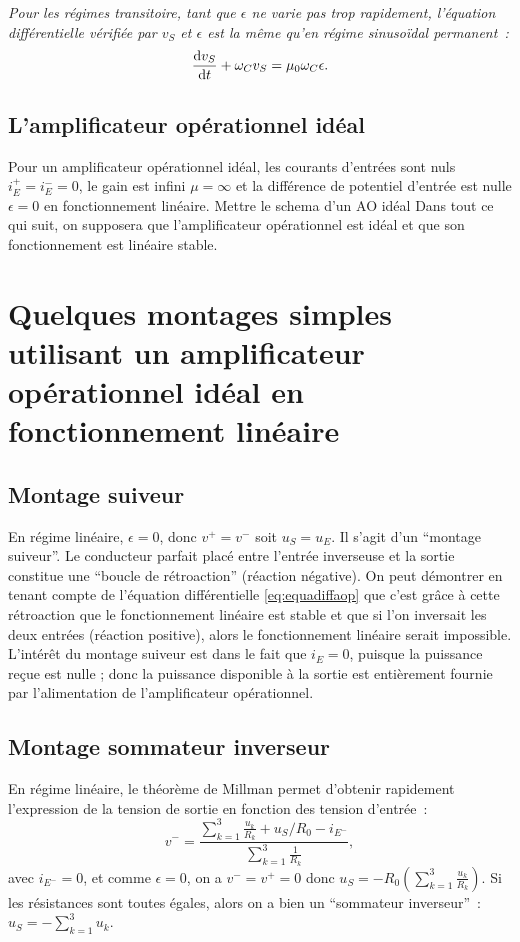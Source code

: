 \emph{Pour les régimes transitoire, tant que \(\epsilon\) ne varie pas trop 
rapidement, l'équation différentielle vérifiée par \(v_S\) et \(\epsilon\) est 
la même qu'en régime sinusoïdal permanent~:}%
\begin{equation}%
  \label{eq:equadiffaop}
  \derived{v_S}{t} + \omega_C v_S = \mu_0 \omega_C \epsilon.
\end{equation}%

\subsection{L'amplificateur opérationnel idéal}%
Pour un amplificateur opérationnel idéal, les courants d'entrées sont nuls 
\(i_E^+ = i_E^-=0\), le gain est infini \(\mu = \infty\) et la différence de 
potentiel d'entrée est nulle \(\epsilon=0\) en fonctionnement linéaire. %
Mettre le schema d'un AO idéal
Dans tout ce qui suit, on supposera que l'amplificateur opérationnel est idéal 
et que son fonctionnement est linéaire stable.

\section{Quelques montages simples utilisant un amplificateur opérationnel 
idéal en fonctionnement linéaire}%
\subsection{Montage suiveur}%
En régime linéaire, \(\epsilon=0\), donc \(v^+ = v^-\) soit \(u_S = u_E\). Il 
s'agit d'un ``montage suiveur''. Le conducteur parfait placé entre l'entrée 
inverseuse et la sortie constitue une ``boucle de rétroaction'' (réaction 
négative). On peut démontrer en tenant compte de l'équation différentielle 
\eqref{eq:equadiffaop} que c'est grâce à cette rétroaction que le 
fonctionnement linéaire est stable et que si l'on inversait les deux entrées 
(réaction positive), alors le fonctionnement linéaire serait impossible. 
L'intérêt du montage suiveur est dans le fait que \(i_E=0\), puisque la 
puissance reçue est nulle ; donc la puissance disponible à la sortie est 
entièrement fournie par l'alimentation de l'amplificateur opérationnel.
\subsection{Montage sommateur inverseur}%
En régime linéaire, le théorème de Millman permet d'obtenir rapidement 
l'expression de la tension de sortie en fonction des tension d'entrée~:
\begin{equation}%
  v^- = \frac{\sum_{k=1}^3 \frac{u_k}{R_k} + u_S/R_0 - i_{E^-}}{\sum_{k=1}^3 
  \frac{1}{R_k}},
\end{equation}%
avec \(i_{E^-}=0\), et comme \(\epsilon=0\), on a \(v^-=v^+=0\) donc \(u_S = 
-R_0 \left(\sum_{k=1}^3 \frac{u_k}{R_k} \right)\). Si les résistances sont 
toutes égales, alors on a bien un ``sommateur inverseur''~:\(u_S = - 
\sum_{k=1}^3 u_k\).
